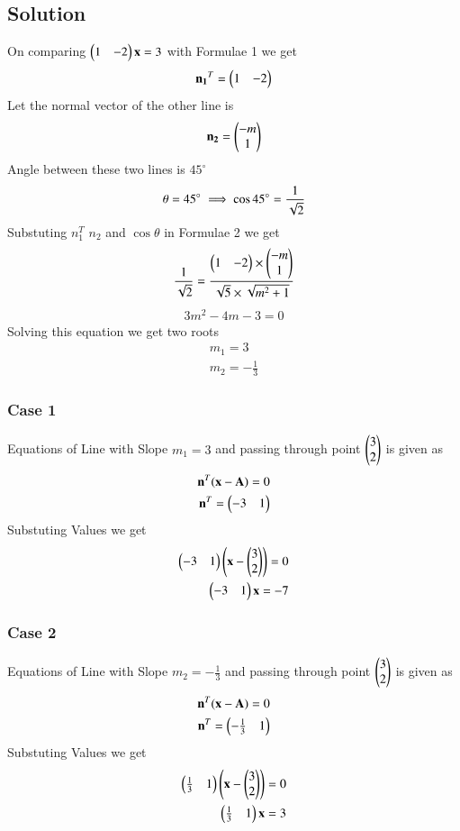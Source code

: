 \documentclass[journal,12pt,twocolumn]{IEEEtran}
\begin{document}
\subsection{Solution}
On comparing $\begin{pmatrix}1 & -2\end{pmatrix}\mathbf{x} = 3$ with Formulae 1  we get 
\begin{align}
\mathbf{n_1}^T=\begin{pmatrix}1 & -2\end{pmatrix}
\end{align}
Let the normal vector of the other line is
\begin{align}
\mathbf{n_2}=\begin{pmatrix}-m\\1\end{pmatrix}  
\end{align}
Angle between these two lines is $45^\circ$
\begin{align}
    \theta=45^\circ
    \implies \cos 45\degree &=\frac{1}{\sqrt{2}}\\ 
\end{align}
Substuting $n_1^T$ $n_2$ and $\cos\theta$ in Formulae 2  we get
\begin{align}
    \frac{1}{\sqrt{2}}=\frac{\begin{pmatrix}1 & -2\end{pmatrix}\times\begin{pmatrix}-m\\1\end{pmatrix}}{\sqrt{5}\times\sqrt{m^2+1}}
\end{align}
\begin{align}
    3m^2-4m-3=0
\end{align}
Solving this equation we get two roots
\begin{align}
m_1=3\\
m_2=-\frac{1}{3}
\end{align}
\subsubsection{Case 1}
Equations of Line with Slope $m_1=3$ and passing through point $\begin{pmatrix}3\\2\end{pmatrix}$ is given as
\begin{align}
   \mathbf{n}^T(\mathbf{x}-\mathbf{A})=0\\
   \mathbf{n}^T=\begin{pmatrix}-3 & 1\end{pmatrix}
\end{align}
Substuting Values we get
\begin{align}
 \begin{pmatrix}-3 & 1\end{pmatrix}\begin{pmatrix}\mathbf{x}-\begin{pmatrix}3\\2\end{pmatrix}\end{pmatrix}=0\\
 \begin{pmatrix}-3 & 1\end{pmatrix}\mathbf{x}=-7
\end{align}
\subsubsection{Case 2}
Equations of Line with Slope $m_2=-\frac{1}{3}$ and passing through point $\begin{pmatrix}3\\2\end{pmatrix}$ is given as
\begin{align}
\mathbf{n}^T(\mathbf{x}-\mathbf{A})=0\\
\mathbf{n}^T=\begin{pmatrix}-\frac{1}{3} & 1\end{pmatrix}
\end{align}
Substuting Values we get
\begin{align}
 \begin{pmatrix}\frac{1}{3} & 1\end{pmatrix}\begin{pmatrix}\mathbf{x}-\begin{pmatrix}3\\2\end{pmatrix}\end{pmatrix}=0\\
 \begin{pmatrix}\frac{1}{3} & 1\end{pmatrix}\mathbf{x}=3
\end{align}
\end{document}
